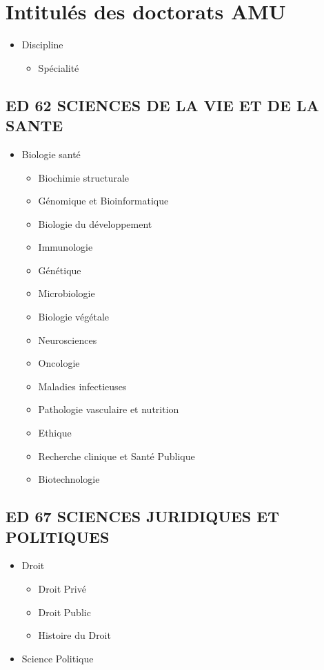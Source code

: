 \section{Intitulés des doctorats AMU}
\label{chap:doctorats}

		\begin{itemize}
		\item Discipline
			\begin{itemize}
			\item Spécialité
			\end{itemize}
		\end{itemize}
		
	\subsection*{ED 62 SCIENCES DE LA VIE ET DE LA SANTE}\label{ed-62-sciences-de-la-vie-et-de-la-sante}

		\begin{itemize}
		\item Biologie santé
			\begin{itemize}
			\item Biochimie structurale
			\item Génomique et  Bioinformatique
			\item Biologie du développement
			\item Immunologie
			\item Génétique
			\item Microbiologie
			\item Biologie végétale
			\item Neurosciences
			\item Oncologie
			\item Maladies infectieuses
			\item Pathologie vasculaire et nutrition
			\item Ethique
			\item Recherche clinique et Santé Publique
			\item Biotechnologie
			\end{itemize}
		\end{itemize}

	\subsection*{ED 67 SCIENCES JURIDIQUES ET POLITIQUES}\label{ed-67-sciences-juridiques-et-politiques}

		\begin{itemize}
		\item Droit
			\begin{itemize}
			\item Droit Privé
			\item Droit Public
			\item Histoire du Droit
			\end{itemize}
		\item Science Politique
		\end{itemize}

